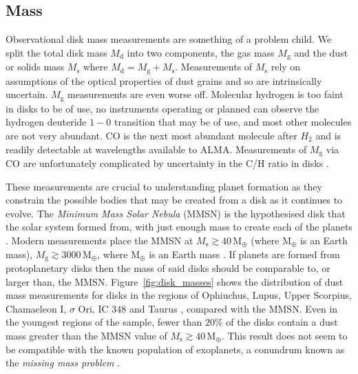 \subsection{Mass}

Observational disk mass measurements are something of a problem child.
We split the total disk mass $M_\mathrm{d}$ into two components, the gas mass $M_\mathrm{g}$  and the dust or solids mass $M_\mathrm{s}$ where $M_\mathrm{d} = M_\mathrm{g} + M_\mathrm{s}$.
Measurements of $M_\mathrm{s}$ rely on assumptions of the optical properties of dust grains and so are intrinsically uncertain.
$M_\mathrm{g}$ measurements are even worse off.
Molecular hydrogen is too faint in disks to be of use, no instruments operating or planned can observe the hydrogen deuteride $1-0$ transition that may be of use, and most other molecules are not very abundant.
CO is the next most abundant molecule after $H_2$ and is readily detectable at wavelengths available to ALMA.
Measurements of $M_\mathrm{g}$ via CO are unfortunately complicated by uncertainty in the C/H ratio in disks \citep[see the review by][for in-depth discussion of difficulties with disk mass measurements]{miotello2022}.

These measurements are crucial to understanding planet formation as they constrain the possible bodies that may be created from a disk as it continues to evolve.
The \textit{Minimum Mass Solar Nebula} (MMSN) is the hypothesised disk that the solar system formed from, with just enough mass to create each of the planets \citep{hayashi1981}.
Modern measurements place the MMSN at $M_\mathrm{s} \gtrsim 40 \, \mathrm{M_\oplus}$ (where $\mathrm{M_\oplus}$ is an Earth mass), $M_\mathrm{g} \gtrsim 3000 \, \mathrm{M_\oplus}$, where $\mathrm{M_\oplus}$ is an Earth mass \citep[see review by][]{andrews2020}.
If planets are formed from protoplanetary disks then the mass of said disks should be comparable to, or larger than, the MMSN.
Figure~\ref{fig:disk_masses} shows the distribution of dust mass measurements for disks in the regions of Ophiuchus, Lupus, Upper Scorpius, Chamaeleon I, $\sigma$ Ori, IC 348 and Taurus \citep[and references therin]{cieza2019}, compared with the MMSN.
Even in the youngest regions of the sample, fewer than $20\%$ of the disks contain a dust mass greater than the MMSN value of $M_\mathrm{s}\gtrsim 40 \, \mathrm{M_\oplus}$.
This result does not seem to be compatible with the known population of exoplanets, a conundrum known as the \textit{missing mass problem} \citep[e.g.][]{najita2014}.

